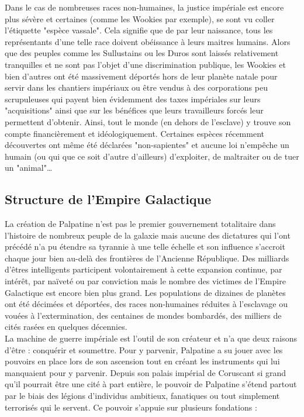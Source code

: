 \documentclass[twoside]{article}
\begin{document}
Dans le cas de nombreuses races non-humaines, la justice impériale est encore plus sévère et certaines (comme les Wookies par exemple), se sont vu coller l'étiquette "espèce vassale". Cela signifie que de par leur naissance, tous les représentants d'une telle race doivent obéissance à leurs maitres humains. Alors que des peuples comme les Sullustains ou les Duros sont laissés relativement tranquilles et ne sont pas l'objet d'une discrimination publique, les Wookies et bien d'autres ont été massivement déportés hors de leur planète natale pour servir dans les chantiers impériaux ou être vendus à des corporations peu scrupuleuses qui payent bien évidemment des taxes impériales sur leurs "acquisitions" ainsi que sur les bénéfices que leurs travailleurs forcés leur permettent d'obtenir. Ainsi, tout le monde (en dehors de l'esclave) y trouve son compte financièrement et idéologiquement. Certaines espèces récemment découvertes ont même été déclarées "non-sapientes" et aucune loi n'empêche un humain (ou qui que ce soit d'autre d'ailleurs) d'exploiter, de maltraiter ou de tuer un "animal"\ldots

\subsection{Structure de l’Empire Galactique}
La création de Palpatine n'est pas le premier gouvernement totalitaire dans l'histoire de nombreux peuple de la galaxie mais aucune des dictatures qui l'ont précédé n'a pu étendre sa tyrannie à une telle échelle et son influence s'accroit chaque jour bien au-delà des frontières de l'Ancienne République. Des milliards d'êtres intelligents participent volontairement à cette expansion continue, par intérêt, par naïveté ou par conviction mais le nombre des victimes de l'Empire Galactique est encore bien plus grand. Les populations de dizaines de planètes ont été décimées et déportées, des races non-humaines réduites à l'esclavage ou vouées à l'extermination, des centaines de mondes bombardés, des milliers de cités rasées en quelques décennies.\\

La machine de guerre impériale est l'outil de son créateur et n'a que deux raisons d'être : conquérir et soumettre. Pour y parvenir, Palpatine a su jouer avec les pouvoirs en place lors de son ascension tout en créant les instruments qui lui manquaient pour y parvenir. Depuis son palais impérial de Coruscant si grand qu'il pourrait être une cité à part entière, le pouvoir de Palpatine s'étend partout par le biais des légions d'individus ambitieux, fanatiques ou tout simplement terrorisés qui le servent. Ce pouvoir s'appuie sur plusieurs fondations :
\end{document}
